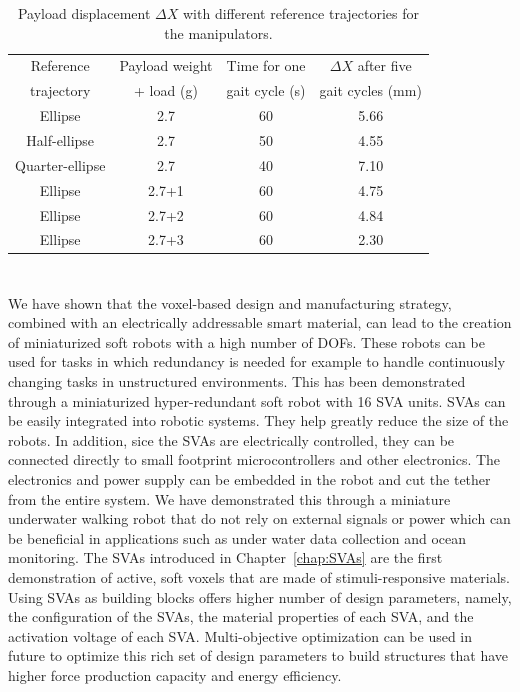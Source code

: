 \begin{table}[t]
\centering
\caption{Payload displacement $\Delta X$ with different reference trajectories for the manipulators.}
\label{table:table_Payload displacement}
\begin{tabular}{c c c c}

\hline
Reference & Payload weight & Time for one & $\Delta X$ after five \\
trajectory & + load (g) & gait cycle (s) & gait cycles (mm)\\
\hline
Ellipse         & 2.7   & 60  & 5.66\\
Half-ellipse    & 2.7   & 50  & 4.55\\
Quarter-ellipse & 2.7   & 40  & 7.10\\
Ellipse         & 2.7+1 & 60  & 4.75\\
Ellipse         & 2.7+2 & 60  & 4.84\\
Ellipse         & 2.7+3 & 60  & 2.30\\
\hline
\end{tabular}
\end{table}

\section{}
We have shown that the voxel-based design and manufacturing strategy, combined with an electrically addressable smart material, can lead to the creation of miniaturized soft robots with a high number of DOFs. These robots can be used for tasks in which redundancy is needed for example to handle continuously changing tasks in unstructured environments. This has been demonstrated through a miniaturized hyper-redundant soft robot with 16 SVA units.
SVAs can be easily integrated into robotic systems. They help greatly reduce the size of the robots. In addition, sice the SVAs are electrically controlled, they can be connected directly to small footprint microcontrollers and other electronics. The electronics and power supply can be embedded in the robot  and cut the tether from the entire system. We have demonstrated this through a miniature underwater walking robot that do not rely on external signals or power which can be beneficial in applications such as under water data collection and ocean monitoring. The SVAs introduced in Chapter~\ref{chap:SVAs} are the first demonstration of active, soft voxels that are made of stimuli-responsive materials. Using SVAs as building blocks offers higher number of design parameters, namely, the configuration of the SVAs, the material properties of each SVA, and the activation voltage of each SVA. Multi-objective optimization can be used in future to optimize this rich set of design parameters to build structures that have higher force production capacity and %
energy efficiency.

